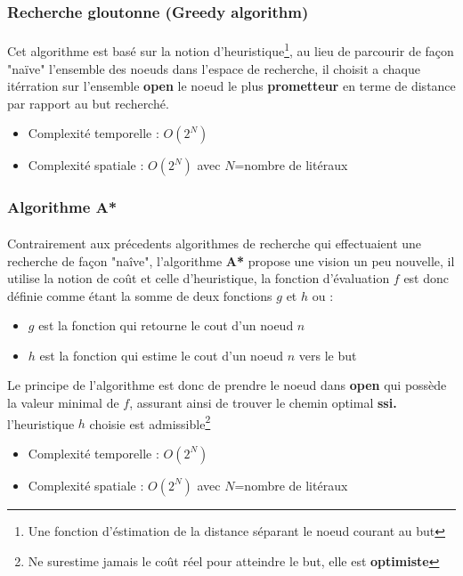 \subsubsection{Recherche gloutonne (Greedy algorithm)}\label{GreedyDef}
\paragraph{}
Cet algorithme est basé sur la notion d'heuristique\footnote[1]{Une fonction d'éstimation de la distance séparant le noeud courant au but }, au lieu de parcourir de façon "naïve" l'ensemble des noeuds dans l'espace de recherche, il choisit a chaque itérration sur l'ensemble \textbf{open} le noeud le plus \textbf{prometteur} en terme de distance par rapport au but recherché.
\begin{itemize}
	\item Complexité temporelle : $O(2^{N})$
	\item Complexité spatiale : $O(2^N)$ avec $N$=nombre de litéraux 
\end{itemize}
\subsubsection{Algorithme A*}\label{AstarDef}
\paragraph{}
Contrairement aux précedents algorithmes de recherche qui effectuaient une recherche de façon "naîve", l'algorithme \textbf{A* }propose une vision un peu nouvelle, il utilise la notion de coût et celle d'heuristique, la fonction d'évaluation $f$ est donc définie comme étant la somme de deux fonctions $g$ et $h$ ou : \\
	\begin{itemize}
		\item $g$ est la fonction  qui retourne le cout d'un noeud $n$
		\item $h$ est la fonction  qui estime le cout d'un noeud $n$ vers le but
	\end{itemize} 
Le principe de l'algorithme est donc de prendre le noeud dans \textbf{open} qui possède la valeur minimal de $f$, assurant ainsi de trouver le chemin optimal \textbf{ssi.} l'heuristique $h$ choisie est admissible\footnote[2]{Ne surestime jamais le coût réel pour atteindre le but, elle est \textbf{optimiste}}
\begin{itemize}
	\item Complexité temporelle : $O(2^{N})$
	\item Complexité spatiale : $O(2^N)$ avec $N$=nombre de litéraux 
\end{itemize}

